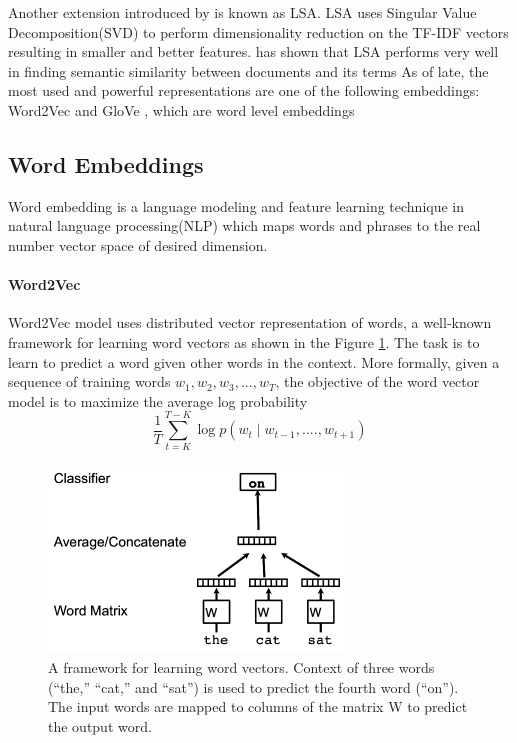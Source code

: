 Another extension introduced by \cite{dumais2004latent} is known as LSA.
LSA uses Singular Value Decomposition(SVD) to perform dimensionality reduction on the TF-IDF vectors resulting in smaller and better features.
\cite{boling2014semantic} has shown that LSA performs very well in finding semantic similarity between documents and its terms
As of late, the most used and
powerful representations are one of the following embeddings: Word2Vec \cite{mikolov2013efficient} 
and GloVe \cite{pennington2014glove}, which are word level embeddings
\subsection{Word Embeddings} 
Word embedding is a language modeling and feature learning technique in natural language processing(NLP) which maps words and phrases to the real number vector space of desired dimension. 

\paragraph{Word2Vec} Word2Vec model uses distributed vector representation of words, a well-known framework for learning word vectors as shown in the Figure \ref{fig:Word2Vec model}. The task is to learn to predict a word given other words in the context.
More formally, given a sequence of training words
$w_{1}, w_{2}, w_{3}, ..., w_{T} $, the objective of the word vector model is to maximize the average log probability
\\
\begin{equation}
\frac{1}{T} \sum_{t=K}^{T-K} \log p(w_{t} \mid w_{t-1},....,w_{t+1}) 
\end{equation}

\begin{figure}[h]
	\centering
	\includegraphics[width=8cm, height=5cm]{w2v.png}
	\caption{A framework for learning word vectors. Context of
		three words (“the,” “cat,” and “sat”) is used to predict the fourth
		word (“on”). The input words are mapped to columns of the matrix
		W to predict the output word.}
	\label{fig:Word2Vec model}
\end{figure}


